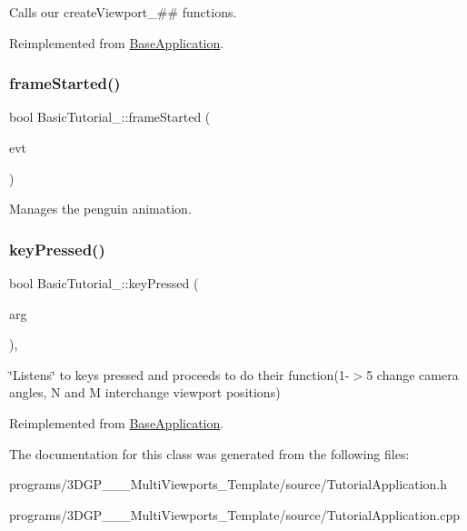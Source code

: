 Calls our create\+Viewport\+\_\+\#\# functions. 



 

Reimplemented from \hyperlink{class_base_application}{Base\+Application}.

\mbox{\label{class_basic_tutorial__00_a94e281a96584a25bf57b1c5e73737c81}} 
\subsubsection{\texorpdfstring{frame\+Started()}{frameStarted()}}
{\footnotesize\ttfamily bool Basic\+Tutorial\+\_\+::frame\+Started (\begin{DoxyParamCaption}\item[{const Ogre\+::\+Frame\+Event \&}]{evt }\end{DoxyParamCaption})\hspace{0.3cm}{\ttfamily [virtual]}}



Manages the penguin animation. 



 \mbox{\label{class_basic_tutorial__00_adc1a0b32d78b1980b3ee51a1b1e1e69b}} 
\subsubsection{\texorpdfstring{key\+Pressed()}{keyPressed()}}
{\footnotesize\ttfamily bool Basic\+Tutorial\+\_\+::key\+Pressed (\begin{DoxyParamCaption}\item[{const O\+I\+S\+::\+Key\+Event \&}]{arg }\end{DoxyParamCaption})\hspace{0.3cm}{\ttfamily [protected]}, {\ttfamily [virtual]}}



\char`\"{}\+Listens\char`\"{} to keys pressed and proceeds to do their function(1-\/$>$5 change camera angles, N and M interchange viewport positions) 



 

Reimplemented from \hyperlink{class_base_application}{Base\+Application}.



The documentation for this class was generated from the following files\+:\begin{DoxyCompactItemize}
\item 
programs/3\+D\+G\+P\+\_\+\_\+\_\+\+Multi\+Viewports\+\_\+\+Template/source/Tutorial\+Application.\+h\item 
programs/3\+D\+G\+P\+\_\+\_\+\_\+\+Multi\+Viewports\+\_\+\+Template/source/Tutorial\+Application.\+cpp\end{DoxyCompactItemize}
